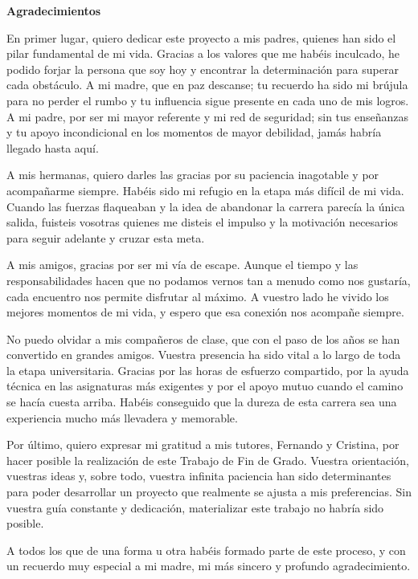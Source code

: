 
\begin{flushleft}
{\Huge \textbf{\sffamily Agradecimientos}}
\end{flushleft}
\vspace{0.5cm}

En primer lugar, quiero dedicar este proyecto a mis padres, quienes han sido el pilar fundamental de mi vida. Gracias a los valores que me habéis inculcado, he podido forjar la persona que soy hoy y encontrar la determinación para superar cada obstáculo. A mi madre, que en paz descanse; tu recuerdo ha sido mi brújula para no perder el rumbo y tu influencia sigue presente en cada uno de mis logros. A mi padre, por ser mi mayor referente y mi red de seguridad; sin tus enseñanzas y tu apoyo incondicional en los momentos de mayor debilidad, jamás habría llegado hasta aquí.

A mis hermanas, quiero darles las gracias por su paciencia inagotable y por acompañarme siempre. Habéis sido mi refugio en la etapa más difícil de mi vida. Cuando las fuerzas flaqueaban y la idea de abandonar la carrera parecía la única salida, fuisteis vosotras quienes me disteis el impulso y la motivación necesarios para seguir adelante y cruzar esta meta.

A mis amigos, gracias por ser mi vía de escape. Aunque el tiempo y las responsabilidades hacen que no podamos vernos tan a menudo como nos gustaría, cada encuentro nos permite disfrutar al máximo. A vuestro lado he vivido los mejores momentos de mi vida, y espero que esa conexión nos acompañe siempre.

No puedo olvidar a mis compañeros de clase, que con el paso de los años se han convertido en grandes amigos. Vuestra presencia ha sido vital a lo largo de toda la etapa universitaria. Gracias por las horas de esfuerzo compartido, por la ayuda técnica en las asignaturas más exigentes y por el apoyo mutuo cuando el camino se hacía cuesta arriba. Habéis conseguido que la dureza de esta carrera sea una experiencia mucho más llevadera y memorable.

Por último, quiero expresar mi gratitud a mis tutores, Fernando y Cristina, por hacer posible la realización de este Trabajo de Fin de Grado. Vuestra orientación, vuestras ideas y, sobre todo, vuestra infinita paciencia han sido determinantes para poder desarrollar un proyecto que realmente se ajusta a mis preferencias. Sin vuestra guía constante y dedicación, materializar este trabajo no habría sido posible.

A todos los que de una forma u otra habéis formado parte de este proceso, y con un recuerdo muy especial a mi madre, mi más sincero y profundo agradecimiento.

\clearpage
